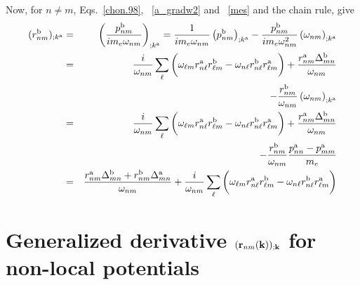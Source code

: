 \documentclass[floatfix,prb,aps,superscriptaddress,11pt,preprint]{revtex4}
\begin{document}
Now, for $n \ne m$, Eqs.~\eqref{chon.98},
~\eqref{a_gradw2} and 
~\eqref{mes} and the chain rule, give
\begin{eqnarray}\label{a_rgendevn}
(r^{\mathrm{b}}_{nm})_{;k^{\mathrm{a}}}&=&\left(\frac{p^{\mathrm{b}}_{nm}}{im_e\omega_{nm}}\right)_{;k^{\mathrm{a}}}
=
\frac{1}
{im_e\omega_{nm}}
\left(
p^{\mathrm{b}}_{nm}
\right)_{;k^{\mathrm{a}}}
-
\frac{p^{\mathrm{b}}_{nm}}
{im_e\omega^2_{nm}}
\left(
\omega_{nm}
\right)_{;k^{\mathrm{a}}}
\nonumber \\
&=&
\frac{i}{\omega_{nm}}
\sum_{\ell}
\bigg(
\omega_{\ell m}
r^{\mathrm{a}}_{n\ell}
r^{\mathrm{b}}_{\ell m}
-
\omega_{n\ell}
r^{\mathrm{b}}_{n\ell}
r^{\mathrm{a}}_{\ell m}
\bigg)
+
\frac{r^{\mathrm{a}}_{nm}
\Delta^{\mathrm{b}}_{mn}}
{\omega_{nm}}
\nonumber \\
&&
-
\frac{r^{\mathrm{b}}_{nm}}
{\omega_{nm}}
\left(
\omega_{nm}
\right)_{;k^{\mathrm{a}}}
\nonumber \\
&=&
\frac{i}{\omega_{nm}}
\sum_{\ell}
\bigg(
\omega_{\ell m}
r^{\mathrm{a}}_{n\ell}
r^{\mathrm{b}}_{\ell m}
-
\omega_{n\ell}
r^{\mathrm{b}}_{n\ell}
r^{\mathrm{a}}_{\ell m}
\bigg)
+
\frac{r^{\mathrm{a}}_{nm}
\Delta^{\mathrm{b}}_{mn}}
{\omega_{nm}}
\nonumber \\
&&
-
\frac{r^{\mathrm{b}}_{nm}}
{\omega_{nm}}
\frac{p^{\mathrm{a}}_{nn}-p^{\mathrm{a}}_{mm}}{m_e}
\nonumber \\
&=&
\frac{
r^{\mathrm{a}}_{nm}
\Delta^{\mathrm{b}}_{mn}
+r^{\mathrm{b}}_{nm}
\Delta^{\mathrm{a}}_{mn}
}
{\omega_{nm}}
+
\frac{i}{\omega_{nm}}
\sum_{\ell}
\bigg(
\omega_{\ell m}
r^{\mathrm{a}}_{n\ell}
r^{\mathrm{b}}_{\ell m}
-
\omega_{n\ell}
r^{\mathrm{b}}_{n\ell}
r^{\mathrm{a}}_{\ell m}
\bigg)
\end{eqnarray}

\section{Generalized derivative $(\mathbf{r}_{nm}(\mathbf{k}))_{;\mathbf{k}}$ for
  non-local potentials}\label{gder}
\end{document}
